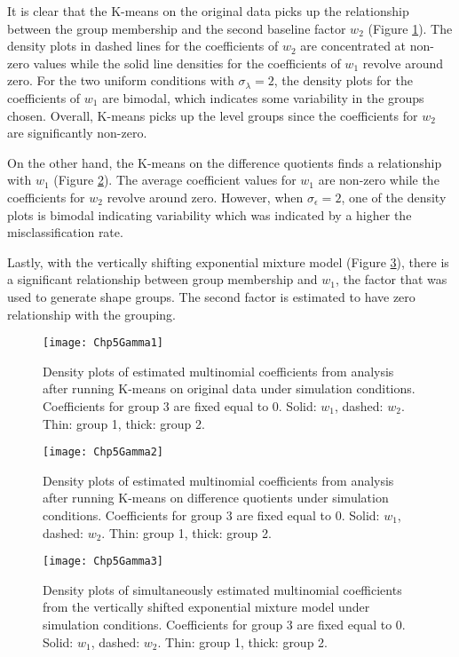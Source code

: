 It is clear that the K-means on the original data picks up the relationship between the group membership and the second baseline factor $w_{2}$ (Figure \ref{fig:gamma1}). The density plots in dashed lines for the coefficients of $w_{2}$ are concentrated at non-zero values while the solid line densities for the coefficients of $w_{1}$ revolve around zero. For the two uniform conditions with $\sigma_{\lambda}=2$, the density plots for the coefficients of $w_{1}$ are bimodal, which indicates some variability in the groups chosen. Overall, K-means picks up the level groups since the coefficients for $w_{2}$ are significantly non-zero.

On the other hand, the K-means on the difference quotients finds a relationship with $w_{1}$ (Figure \ref{fig:gamma2}). The average coefficient values for $w_{1}$ are non-zero while the coefficients for $w_{2}$ revolve around zero. However, when $\sigma_{\epsilon}=2$, one of the density plots is bimodal indicating variability which was indicated by a higher the misclassification rate.

Lastly, with the vertically shifting exponential mixture model (Figure \ref{fig:gamma3}), there is a significant relationship between group membership and $w_{1}$, the factor that was used to generate shape groups. The second factor is estimated to have zero relationship with the grouping.

\begin{landscape}
\begin{figure}[ht]
\centering
\texttt{[image: Chp5Gamma1]}
\caption{Density plots of estimated multinomial coefficients from analysis after running K-means on original data under  simulation conditions. Coefficients for group 3 are fixed equal to 0. Solid: $w_{1}$, dashed: $w_{2}$. Thin: group 1, thick:  group 2.}
\label{fig:gamma1}
\end{figure}

\begin{figure}[ht]
\centering
\texttt{[image: Chp5Gamma2]}
\caption{Density plots of estimated multinomial coefficients from analysis after running K-means on difference quotients under simulation conditions. Coefficients for group 3 are fixed equal to 0. Solid: $w_{1}$, dashed: $w_{2}$. Thin: group 1, thick:  group 2.}
\label{fig:gamma2}
\end{figure}
\begin{figure}[ht]
\centering
\texttt{[image: Chp5Gamma3]}
\caption{Density plots of simultaneously estimated multinomial coefficients from the vertically shifted exponential mixture model under simulation conditions. Coefficients for group 3 are fixed equal to 0. Solid: $w_{1}$, dashed: $w_{2}$. Thin: group 1, thick:  group 2.}
\label{fig:gamma3}
\end{figure}
\end{landscape}

